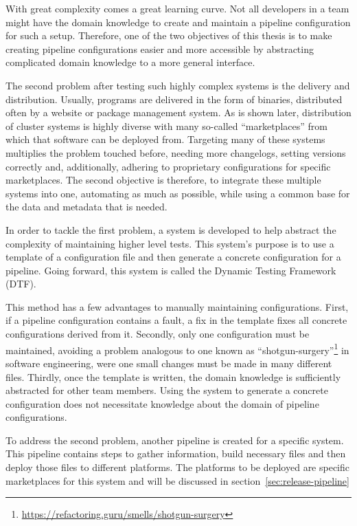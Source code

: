 With great complexity comes a great learning curve.
Not all developers in a team might have the domain knowledge to create and maintain a pipeline configuration for such a setup.
Therefore, one of the two objectives of this thesis is to make creating pipeline configurations easier and more accessible by abstracting complicated domain knowledge to a more general interface.

The second problem after testing such highly complex systems is the delivery and distribution.
Usually, programs are delivered in the form of binaries, distributed often by a website or package management system.
As is shown later, distribution of cluster systems is highly diverse with many so-called ``marketplaces'' from which that software can be deployed from.
Targeting many of these systems multiplies the problem touched before, needing more changelogs, setting versions correctly and, additionally, adhering to proprietary configurations for specific marketplaces.
The second objective is therefore, to integrate these multiple systems into one, automating as much as possible, while using a common base for the data and metadata that is needed.

In order to tackle the first problem, a system is developed to help abstract the complexity of maintaining higher level tests.
This system's purpose is to use a template of a configuration file and then generate a concrete configuration for a pipeline.
Going forward, this system is called the Dynamic Testing Framework (DTF).

\pagebreak

This method has a few advantages to manually maintaining configurations.
First, if a pipeline configuration contains a fault, a fix in the template fixes all concrete configurations derived from it.
Secondly, only one configuration must be maintained, avoiding a problem analogous to one known as ``shotgun-surgery''\footnote{\url{https://refactoring.guru/smells/shotgun-surgery}} in software engineering, were one small changes must be made in many different files.
Thirdly, once the template is written, the domain knowledge is sufficiently abstracted for other team members.
Using the system to generate a concrete configuration does not necessitate knowledge about the domain of pipeline configurations.

To address the second problem, another pipeline is created for a specific system.
This pipeline contains steps to gather information, build necessary files and then deploy those files to different platforms.
The platforms to be deployed are specific marketplaces for this system and will be discussed in section~\ref{sec:release-pipeline}

